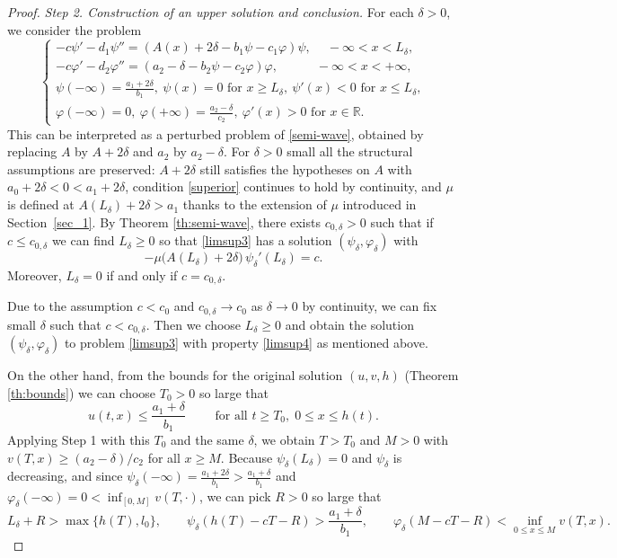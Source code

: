 \documentclass[10pt,a4paper]{amsart}
\newcommand{\rev}[1]{#1}
\begin{document}
\begin{proof}
		\textit{Step 2. Construction of an upper solution and conclusion.}
		For each $\delta>0$, we consider the problem
		\begin{equation}\label{limsup3}
			\begin{cases}
				-c \psi' - d_1 \psi'' = (A(x)+2\delta - b_1\psi - c_1\varphi)\psi, ~\quad-\infty < x < L_\delta,\\
				-c \varphi' - d_2 \varphi'' = (a_2 - \delta - b_2\psi - c_2\varphi)\varphi, \quad\qquad -\infty < x < +\infty,\\
				\psi(-\infty) = \frac{a_1 + 2\delta}{b_1}, ~ \psi(x)=0 \text{ for } x\ge L_\delta, ~ \psi'(x)<0 \text{ for } x\le L_\delta,\\	
				\varphi(-\infty) = 0, ~ \varphi(+\infty)=\frac{a_2 - \delta}{c_2}, ~ \varphi'(x)>0 \text{ for } x\in \mathbb{R}.
			\end{cases}
		\end{equation}
		This can be interpreted as a perturbed problem of \eqref{semi-wave}\rev{,
		obtained by replacing $A$ by $A+2\delta$ and $a_2$ by $a_2-\delta$. For
		$\delta>0$ small all the structural assumptions are preserved: $A+2\delta$
		still satisfies the hypotheses on $A$ with $a_0+2\delta<0<a_1+2\delta$,
		condition \eqref{superior} continues to hold by continuity, and $\mu$ is
		defined at $A(L_\delta)+2\delta>a_1$ thanks to the extension of $\mu$
		introduced in Section~\ref{sec_1}}. By Theorem \ref{th:semi-wave}, there exists $c_{0,\delta}>0$ such that if $c \le c_{0,\delta}$ we can find $L_\delta \ge 0$ so that \eqref{limsup3} has a solution \((\psi_\delta,\varphi_\delta)\) with
		\begin{equation}\label{limsup4}
			-\mu\bigl(A(L_\delta)+2\delta\bigr)\,\psi_\delta'(L_\delta)=c.
		\end{equation}
		Moreover, $L_\delta=0$ if and only if $c=c_{0,\delta}$.
		
		Due to the assumption $c < c_0$ and $c_{0,\delta} \to c_0$ as $\delta \to 0$ by continuity, we can fix small $\delta$ such that $c < c_{0,\delta}$. Then we choose $L_\delta \ge 0$ and obtain the solution \((\psi_\delta,\varphi_\delta)\) to problem \eqref{limsup3} with property \eqref{limsup4} as mentioned above.
		
		On the other hand, from the bounds for the original solution \((u,v,h)\) (Theorem \ref{th:bounds}) we can choose \(T_0>0\) so large that
		\[
		u(t,x)\le\frac{a_1+\delta}{b_1}\qquad\text{ for all } t\ge T_0,\;0\le x\le h(t).
		\]
		Applying Step 1 with this $T_0$ and the same $\delta$, we obtain \(T>T_0\) and \(M>0\) with \(v(T,x)\ge (a_2-\delta)/c_2\) for all \(x\ge M\).
		Because \(\psi_\delta(L_\delta)=0\) and \(\psi_\delta\) is decreasing, \rev{and
		since $\psi_\delta(-\infty)=\frac{a_1+2\delta}{b_1}>\frac{a_1+\delta}{b_1}$
		and $\varphi_\delta(-\infty)=0<\inf_{[0,M]}v(T,\cdot)$,} we can pick \(R>0\) so large that
		\[
		L_\delta+R>\max\{h(T),l_0\},\qquad
		\psi_\delta(h(T)\rev{{}-cT}-R)>\frac{a_1+\delta}{b_1},\qquad
		\varphi_\delta(M\rev{{}-cT}-R)<\inf_{0\le x\le M}v(T,x).
		\]
		

\end{proof}
\end{document}
